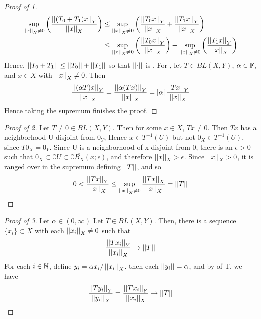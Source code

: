 \begin{prop}
\begin{proof}[Proof of 1]
    \begin{align*}
    \sup\limits_{\left|\left| x \right|\right|_X \neq 0} \left( \frac{\left|\left| (T_0+T_1)x \right|\right|_Y}{\left|\left| x \right|\right|_X}\right) & \leq\sup\limits_{\left|\left| x \right|\right|_X \neq 0} \left(  \frac{\left|\left| T_0x \right|\right|_Y}{\left|\left| x \right|\right|_X}+ \frac{\left|\left| T_1x \right|\right|_Y}{\left|\left| x \right|\right|_X}\right)\\
& \leq\sup\limits_{\left|\left| x \right|\right|_X \neq 0} \left(  \frac{\left|\left| T_0x \right|\right|_Y}{\left|\left| x \right|\right|_X}\right) + \sup\limits_{\left|\left| x \right|\right|_X \neq 0} \left( \frac{\left|\left| T_1x \right|\right|_Y}{\left|\left| x \right|\right|_X}\right)\\
    \end{align*}
    Hence, $\left|\left| T_0+T_1 \right|\right| \leq \left|\left| T_0 \right|\right|+\left|\left| T_1 \right|\right|$ so that $\left|\left| \cdot \right|\right|$ is \Subadditive. 
    For \ScalarHomogeneity, let $T \in BL(X,Y)$, $\alpha \in \mathbb{F}$, and $x \in X$ with $\left|\left| x \right|\right|_X \neq 0$. 
    Then 
    \begin{align*}
        \frac{\left|\left| (\alpha T)x \right|\right|_Y}{\left|\left| x \right|\right|_X} = \frac{\left|\left| \alpha (Tx) \right|\right|_Y}{\left|\left| x \right|\right|_X} = \left| \alpha \right| \frac{\left|\left| Tx \right|\right|_Y}{\left|\left| x \right|\right|_X}
    \end{align*}
    Hence taking the supremum finishes the proof.
\end{proof}
\begin{proof}[Proof of 2] 
   Let $T \neq 0 \in BL(X,Y)$. Then for some $x \in X$, $Tx \neq 0$. 
   Then $Tx$ has a neighborhood U disjoint from $0_Y$, 
   Hence $x \in T^{-1}(U)$ but not $0_X \in T^{-1}(U)$, since $T0_X = 0_Y$.
   Since U is a neighborhood of x disjoint from 0, 
   there is an $\epsilon > 0$ such that $0_X \subset \complement U \subset \complement \overline{B_X}(x;\epsilon)$,
   and therefore $\left|\left| x \right|\right|_X > \epsilon$. 
   Since $\left|\left| x \right|\right|_X > 0$, it is ranged over in the supremum defining $\left|\left| T \right|\right|$, and so
   \begin{equation}
   0 < \frac{\left|\left| Tx \right|\right|_Y}{\left|\left| x \right|\right|_X} \leq \sup\limits_{\left|\left| x \right|\right|_X \neq 0} \frac{\left|\left| Tx \right|\right|_X}{\left|\left| x \right|\right|_X}=\left|\left| T \right|\right|
   \end{equation}
\end{proof}
\begin{proof}[Proof of 3] 
    Let $\alpha \in (0,\infty)$
   Let $T \in BL(X,Y)$. 
   Then, there is a sequence $\{x_i\} \subset X$ with each $\left|\left| x_i \right|\right|_X \neq 0$ 
   such that 
   \begin{equation}
    \frac{\left|\left| Tx_i \right|\right|_Y}{\left|\left| x_i \right|\right|_X} \to \left|\left| T \right|\right|
    \end{equation}
    For each $i \in \mathbb{N}$, define $y_i =\alpha  x_i/\left|\left| x_i \right|\right|_X$. 
    then each $\left|\left| y_i \right|\right| = \alpha$, 
    and by \ScalarHomogeneity
    of T, we have 
    \begin{equation}
    \frac{\norm{Ty_i}_Y}{\norm{y_i}_X} = \frac{\norm{Tx_i}_Y}{\norm{x_i}_X} \to \norm{T}

\end{equation}
\end{proof}
\end{prop}
